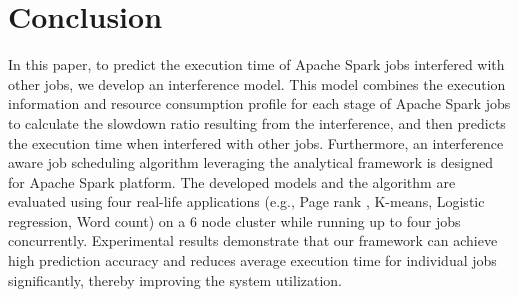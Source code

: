 \section{Conclusion}
\label{conclusion}
In this paper, to predict the execution time of Apache Spark jobs interfered with other jobs, we develop an interference model. This model combines the execution information and resource consumption profile for each stage of Apache Spark jobs to calculate the slowdown ratio resulting from the interference, and then predicts the execution time when interfered with other jobs. Furthermore, an interference aware job scheduling algorithm leveraging the analytical framework is designed for Apache Spark platform. The developed models and the algorithm are evaluated using four real-life applications (e.g., Page rank , K-means, Logistic regression, Word count) on a 6 node cluster while running up to four jobs concurrently. Experimental results demonstrate that our framework can achieve high prediction accuracy and reduces average execution time for individual jobs significantly, thereby improving the system utilization. 



